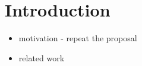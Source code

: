 \section{Introduction}

\begin{itemize}
  \item motivation - repeat the proposal
  \item related work
\end{itemize}
